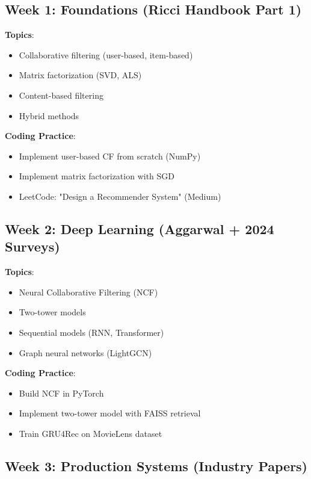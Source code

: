 \documentclass[10pt]{article}
\begin{document}
\subsection{Week 1: Foundations (Ricci Handbook Part 1)}

\textbf{Topics}:
\begin{itemize}[leftmargin=*]
    \item Collaborative filtering (user-based, item-based)
    \item Matrix factorization (SVD, ALS)
    \item Content-based filtering
    \item Hybrid methods
\end{itemize}

\textbf{Coding Practice}:
\begin{itemize}[leftmargin=*]
    \item Implement user-based CF from scratch (NumPy)
    \item Implement matrix factorization with SGD
    \item LeetCode: "Design a Recommender System" (Medium)
\end{itemize}

\subsection{Week 2: Deep Learning (Aggarwal + 2024 Surveys)}

\textbf{Topics}:
\begin{itemize}[leftmargin=*]
    \item Neural Collaborative Filtering (NCF)
    \item Two-tower models
    \item Sequential models (RNN, Transformer)
    \item Graph neural networks (LightGCN)
\end{itemize}

\textbf{Coding Practice}:
\begin{itemize}[leftmargin=*]
    \item Build NCF in PyTorch
    \item Implement two-tower model with FAISS retrieval
    \item Train GRU4Rec on MovieLens dataset
\end{itemize}

\subsection{Week 3: Production Systems (Industry Papers)}
\end{document}
